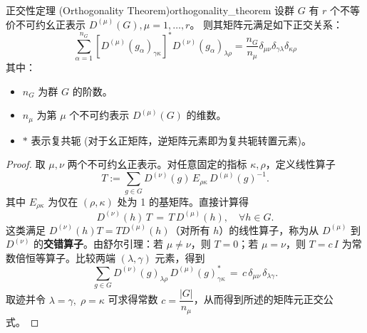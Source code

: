 \begin{theorem}{正交性定理 (Orthogonality Theorem)}{orthogonality_theorem}
    设群 $G$ 有 $r$ 个不等价不可约幺正表示 $D^{(\mu)}(G), \mu=1, \dots, r$。
    则其矩阵元满足如下正交关系：
    \begin{equation}
        \sum_{\alpha=1}^{n_G} [D^{(\mu)}(g_\alpha)_{\gamma\kappa}]^* D^{(\nu)}(g_\alpha)_{\lambda\rho} = \frac{n_G}{n_\mu} \delta_{\mu\nu} \delta_{\gamma\lambda} \delta_{\kappa\rho}
    \end{equation}
    其中：
    \begin{itemize}
        \item $n_G$ 为群 $G$ 的阶数。
        \item $n_\mu$ 为第 $\mu$ 个不可约表示 $D^{(\mu)}(G)$ 的维数。
        \item $*$ 表示复共轭 (对于幺正矩阵，逆矩阵元素即为复共轭转置元素)。
    \end{itemize}
\end{theorem}

\begin{proof}
    取 $\mu,\nu$ 两个不可约幺正表示。对任意固定的指标 $\kappa,\rho$，定义线性算子
    \begin{equation*}
        T := \sum_{g\in G} D^{(\nu)}(g)\, E_{\rho\kappa}\, D^{(\mu)}(g)^{-1}.
    \end{equation*}
    其中 $E_{\rho\kappa}$ 为仅在 $(\rho,\kappa)$ 处为 1 的基矩阵。直接计算得
    \begin{equation*}
        D^{(\nu)}(h)\, T \,=\, T\, D^{(\mu)}(h), \quad \forall h\in G.
    \end{equation*}
    这类满足 $D^{(\nu)}(h)T=TD^{(\mu)}(h)$（对所有 $h$）的线性算子，称为从 $D^{(\mu)}$ 到 $D^{(\nu)}$ 的\textbf{交错算子}。由舒尔引理：若 $\mu\ne\nu$，则 $T=0$；若 $\mu=\nu$，则 $T=c\,I$ 为常数倍恒等算子。比较两端 $(\lambda,\gamma)$ 元素，得到
    \begin{equation*}
        \sum_{g\in G} D^{(\nu)}(g)_{\lambda\rho}\, D^{(\mu)}(g)_{\gamma\kappa}^* \,=\, c\, \delta_{\mu\nu}\, \delta_{\lambda\gamma}.
    \end{equation*}
    取迹并令 $\lambda=\gamma,\;\rho=\kappa$ 可求得常数 $c=\dfrac{|G|}{n_\mu}$，从而得到所述的矩阵元正交公式。
\end{proof}

